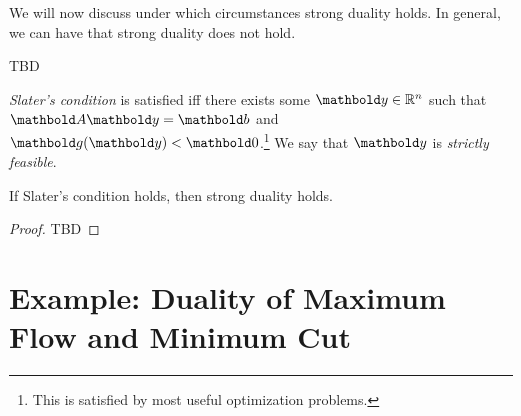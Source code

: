 We will now discuss under which circumstances strong duality holds. In general, we can have that strong duality does not hold. \begin{ex} TBD
\end{ex}

\begin{defn} \emph{Slater's condition} is satisfied iff there exists some $\vy \in \R^n$ such that $\mA\vy = \vb$ and $\vg(\vy) < \vZero$.\footnote{This is satisfied by most useful optimization problems.} We say that $\vy$ is \emph{strictly feasible}.
\end{defn}

\begin{thm}
If Slater's condition holds, then strong duality holds.
\end{thm}
\begin{proof}
TBD
\end{proof}

\section{Example: Duality of Maximum Flow and Minimum Cut}\label{sec:max_flow_min_cut_duality}

